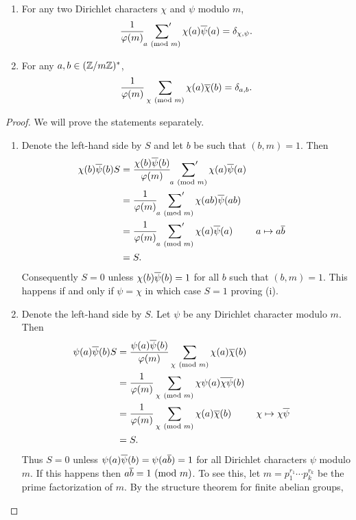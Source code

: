     \begin{proposition*}
    \phantom{ }
      \begin{enumerate}[label*=(\roman*)]
        \item For any two Dirichlet characters $\chi$ and $\psi$ modulo $m$,
        \[
          \frac{1}{\varphi(m)}\sideset{}{'}\sum_{a \ (\mathrm{mod}\text{ }m)}\chi(a)\overline{\psi}(a) = \delta_{\chi,\psi}.
        \]
        \item For any $a,b \in (\mathbb{Z}/m\mathbb{Z})^{\ast}$,
        \[
          \frac{1}{\varphi(m)}\sum_{\chi \ (\mathrm{mod}\text{ }m)}\chi(a)\overline{\chi}(b) = \delta_{a,b}.
        \]
      \end{enumerate}
    \end{proposition*}
    \begin{proof}
      We will prove the statements separately.
      \begin{enumerate}[label*=(\roman*)]
        \item Denote the left-hand side by $S$ and let $b$ be such that $(b,m) = 1$. Then
        \begin{align*}
          \chi(b)\overline{\psi}(b)S &= \frac{\chi(b)\overline{\psi}(b)}{\varphi(m)}\sideset{}{'}\sum_{a \ (\mathrm{mod}\text{ }m)}\chi(a)\overline{\psi}(a) \\
          &= \frac{1}{\varphi(m)}\sideset{}{'}\sum_{a \ (\mathrm{mod}\text{ }m)}\chi(ab)\overline{\psi}(ab) \\
          &= \frac{1}{\varphi(m)}\sideset{}{'}\sum_{a \ (\mathrm{mod}\text{ }m)}\chi(a)\overline{\psi}(a) && \text{$a \mapsto a\overline{b}$} \\
          &= S.
        \end{align*}
        Consequently $S = 0$ unless $\chi(b)\overline{\psi}(b) = 1$ for all $b$ such that $(b,m) = 1$. This happens if and only if $\psi = \chi$ in which case $S = 1$ proving (i).
        \item Denote the left-hand side by $S$. Let $\psi$ be any Dirichlet character modulo $m$. Then
        \begin{align*}
          \psi(a)\overline{\psi}(b)S &= \frac{\psi(a)\overline{\psi}(b)}{\varphi(m)}\sum_{\chi \ (\mathrm{mod}\text{ }m)}\chi(a)\overline{\chi}(b) \\
          &= \frac{1}{\varphi(m)}\sum_{\chi \ (\mathrm{mod}\text{ }m)}\chi\psi(a)\overline{\chi\psi}(b) \\
          &= \frac{1}{\varphi(m)}\sum_{\chi \ (\mathrm{mod}\text{ }m)}\chi(a)\overline{\chi}(b) && \text{$\chi \mapsto \chi\overline{\psi}$} \\
          &= S.
        \end{align*}
        Thus $S = 0$ unless $\psi(a)\overline{\psi}(b) = \psi(a\overline{b}) = 1$ for all Dirichlet characters $\psi$ modulo $m$. If this happens then $a\overline{b} = 1 \ (\mathrm{mod}\text{ }m)$. To see this, let $m = p_{1}^{r_{1}} \cdots p_{k}^{r_{k}}$ be the prime factorization of $m$. By the structure theorem for finite abelian groups,

\end{enumerate}
\end{proof}
